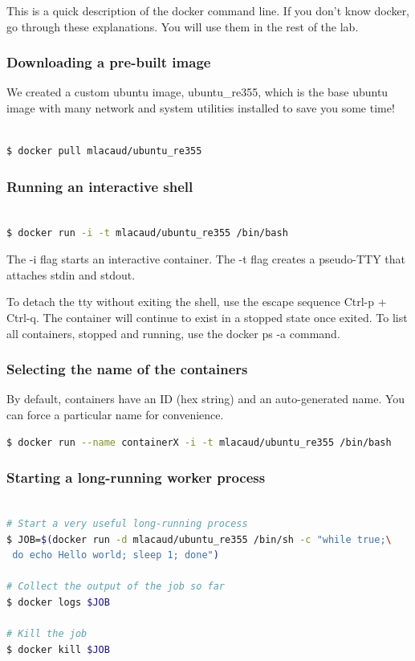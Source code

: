 \documentclass[a4paper,11pt]{exam}
\begin{document}
This is a quick description of the docker command line. If you don't know docker, go through these explanations. You will use them in the rest of the lab.

\subsubsection*{Downloading a pre-built image}

We created a custom ubuntu image, ubuntu\_re355, which is the base ubuntu image with many network and system utilities installed to save you some time!

\begin{lstlisting}[frame=single,language={sh}]  % Start your code-block

$ docker pull mlacaud/ubuntu_re355
\end{lstlisting}

\subsubsection*{Running an interactive shell}
\begin{lstlisting}[frame=single,language={sh}]  % Start your code-block

$ docker run -i -t mlacaud/ubuntu_re355 /bin/bash       
\end{lstlisting}

The -i flag starts an interactive container. The -t flag creates a pseudo-TTY that attaches stdin and stdout.

To detach the tty without exiting the shell, use the escape sequence Ctrl-p + Ctrl-q. The container will continue to exist in a stopped state once exited. To list all containers, stopped and running, use the docker ps -a command.

\subsubsection*{Selecting the name of the containers}
By default, containers have an ID (hex string) and an auto-generated name. You can force a particular name for convenience.
\begin{lstlisting}[frame=single,language={sh}]  
$ docker run --name containerX -i -t mlacaud/ubuntu_re355 /bin/bash       
\end{lstlisting}



\subsubsection*{Starting a long-running worker process}
\begin{lstlisting}[frame=single,language={sh}]  % Start your code-block

# Start a very useful long-running process
$ JOB=$(docker run -d mlacaud/ubuntu_re355 /bin/sh -c "while true;\
 do echo Hello world; sleep 1; done")

# Collect the output of the job so far
$ docker logs $JOB

# Kill the job
$ docker kill $JOB
\end{lstlisting}
\end{document}
